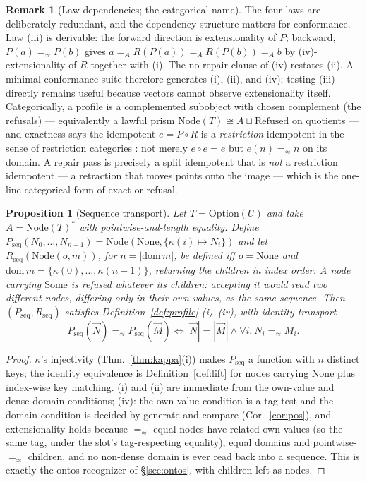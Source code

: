 \documentclass[11pt]{article}
\newtheorem{proposition}[theorem]{Proposition}
\theoremstyle{definition}
\newtheorem{remark}[theorem]{Remark}
\newcommand{\NodeT}[1]{\mathrm{Node}(#1)}
\newcommand{\dom}{\mathrm{dom}\,}
\newcommand{\eqS}{=_{\approx}}                     %
\begin{document}
\begin{remark}[Law dependencies; the categorical name]\label{rem:profilelaws}
The four laws are deliberately redundant, and the dependency structure matters for
conformance. Law (iii) is derivable: the forward direction is extensionality of $P$;
backward, $P(a) \eqS P(b)$ gives $a =_A R(P(a)) =_A R(P(b)) =_A b$ by
(iv)-extensionality of $R$ together with (i). The no-repair clause of (iv) restates
(ii). A minimal conformance suite therefore generates (i), (ii), and (iv); testing
(iii) directly remains useful because vectors cannot observe extensionality itself.
Categorically, a profile is a complemented subobject with chosen complement (the
refusals) --- equivalently a lawful prism $\NodeT{T} \cong A \sqcup
\mathrm{Refused}$ on quotients --- and exactness says the idempotent
$e = P \circ R$ is a \emph{restriction} idempotent in the sense of restriction
categories \cite{cockettlack}: not merely $e \circ e = e$ but $e(n) \eqS n$ on its
domain. A repair pass is precisely a split idempotent that is \emph{not} a
restriction idempotent --- a retraction that moves points onto the image --- which is
the one-line categorical form of exact-or-refusal.
\end{remark}

\begin{proposition}[Sequence transport]\label{prop:pos-transport}
Let $T = \mathrm{Option}(U)$ and take $A = \NodeT{T}^{*}$ with pointwise-and-length
equality. Define
$P_{\mathrm{seq}}(N_0, \dots, N_{n-1}) = \mathrm{Node}(\mathrm{None}, \{\kappa(i) \mapsto
N_i\})$ and let $R_{\mathrm{seq}}(\mathrm{Node}(o, m))$, for $n = |\dom m|$, be defined iff
$o = \mathrm{None}$ and $\dom m = \{\kappa(0), \dots, \kappa(n-1)\}$, returning the
children in index order. A node carrying $\mathrm{Some}$ is refused whatever its children:
accepting it would read two different nodes, differing only in their own values, as the
same sequence. Then $(P_{\mathrm{seq}}, R_{\mathrm{seq}})$ satisfies
Definition~\ref{def:profile} (i)--(iv), with identity transport
\[
P_{\mathrm{seq}}(\vec{N}) \eqS P_{\mathrm{seq}}(\vec{M})
\iff |\vec N| = |\vec M| \wedge \forall i.\ N_i \eqS M_i .
\]
\end{proposition}

\begin{proof}
$\kappa$'s injectivity (Thm.~\ref{thm:kappa}(i)) makes $P_{\mathrm{seq}}$ a function
with $n$ distinct keys; the identity equivalence is Definition~\ref{def:lift} for
nodes carrying $\mathrm{None}$ plus index-wise key matching. (i) and (ii) are immediate from the
own-value and dense-domain conditions; (iv): the own-value condition is a tag test and
the domain condition is decided by generate-and-compare (Cor.~\ref{cor:pos}), and
extensionality holds because $\eqS$-equal nodes have related own values (so the same
tag, under the slot's tag-respecting equality), equal domains and pointwise-$\eqS$ children, and no non-dense domain is ever read back into
a sequence. This is exactly the ontos recognizer of \S\ref{sec:ontos}, with children
left as nodes.
\end{proof}
\end{document}
